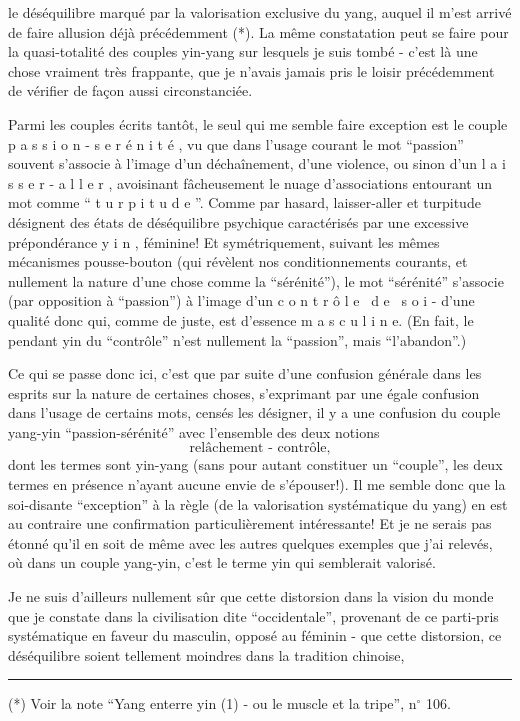 
le déséquilibre marqué par la valorisation exclusive du yang, auquel il m'est arrivé de faire allusion déjà précédemment (*). La même constatation peut se faire pour la quasi-totalité des couples yin-yang sur lesquels je suis tombé - c'est là une chose vraiment très frappante, que je n'avais jamais pris le loisir précédemment de vérifier de façon aussi circonstanciée.

Parmi les couples écrits tantôt, le seul qui me semble faire exception est le couple p a s s i o n - s e r é n i t é , vu que dans l'usage courant\handwritten{,} le mot ``passion'' souvent s'associe à l'image d'un déchaînement, d'une violence, ou sinon d'un l a i s s e r - a l l e r , avoisinant fâcheusement le nuage d'associations entourant un mot comme `` t u r p i t u d e ''. Comme par hasard, laisser-aller et turpitude désignent des états de déséquilibre psychique caractérisés par une excessive prépondérance y i n , féminine! Et symétriquement, suivant les mêmes mécanismes pousse-bouton (qui révèlent nos conditionnements courants, et nullement la nature d'une chose comme la ``sérénité''), le mot ``sérénité'' s'associe (par opposition à ``passion'') à l'image d'un c o n t r ô l e \ d e \ s o i - d'une qualité donc qui, comme de juste, est d'essence m a s c u l i n e. (En fait, le pendant yin du ``contrôle'' n'est nullement la ``passion'', mais ``l'abandon''.)

Ce qui se passe donc ici, c'est que par suite d'une confusion générale dans les esprits sur la nature de certaines choses, s'exprimant par une égale confusion dans l'usage de certains mots, censés les désigner, il y a une confusion du couple yang-yin ``passion-sérénité'' avec l'ensemble des deux notions
\[ \text{relâchement - contrôle,} \]
dont les termes sont yin-yang (sans pour autant constituer un ``couple'', les deux termes en présence n'ayant aucune envie de s'épouser!). Il me semble donc que la soi-disante ``exception'' à la règle (de la valorisation systématique du yang) en est au contraire une confirmation particulièrement intéressante! Et je ne serais pas étonné qu'il en soit de même avec les autres quelques exemples que j'ai relevés, où dans un couple yang-yin, c'est le terme yin qui semblerait valorisé.

Je ne suis d'ailleurs nullement sûr que cette distorsion dans la vision du monde que je constate dans la civilisation dite ``occidentale'', provenant de ce parti-pris systématique en faveur du masculin, opposé au féminin - que cette distorsion, ce déséquilibre soient tellement moindres dans la tradition chinoise,

\noindent\rule{.22\linewidth}{.4pt}\par
(*) Voir la note ``Yang enterre yin (1) - ou le muscle et la tripe'', n$^\circ$ 106.

